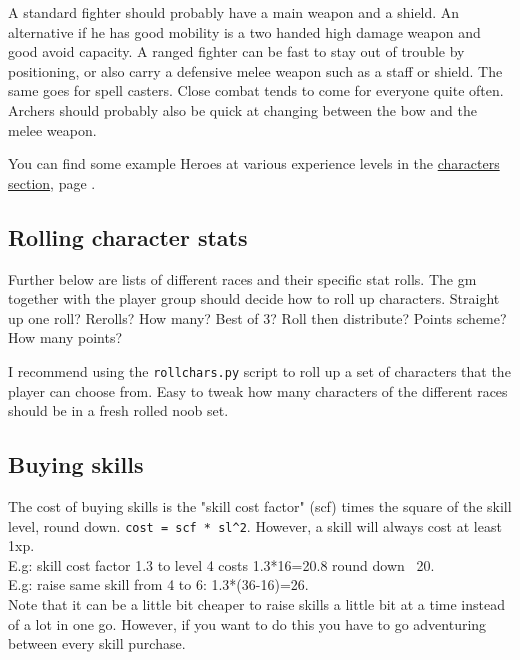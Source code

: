A standard fighter should probably have a main weapon and a shield. An alternative if he has good mobility is a two handed high damage weapon and good avoid capacity. A ranged fighter can be fast to stay out of trouble by positioning, or also carry a defensive melee weapon such as a staff or shield. The same goes for spell casters. Close combat tends to come for everyone quite often. Archers should probably also be quick at changing between the bow and the melee weapon.

You can find some example Heroes at various experience levels in the \hyperref[cpt:characters]{characters section}, page \pageref{cpt:characters}.


\subsection*{Rolling character stats}
Further below are lists of different races and their specific stat rolls. The gm together with the player group should decide how to roll up characters. Straight up one roll? Rerolls? How many? Best of 3? Roll then distribute? Points scheme? How many points?

I recommend using the \verb|rollchars.py| script to roll up a set of characters that the player can choose from. Easy to tweak how many characters of the different races should be in a fresh rolled noob set.





\subsection*{Buying skills}
The cost of buying skills is the "skill cost factor" (scf) times the square of the skill level, round down. \verb|cost = scf * sl^2|. However, a skill will always cost at least 1xp. \\
E.g: skill cost factor 1.3 to level 4 costs 1.3*16=20.8 round down ~20. \\
E.g: raise same skill from 4 to 6: 1.3*(36-16)=26. \\
Note that it can be a little bit cheaper to raise skills a little bit at a time instead of a lot in one go. However, if you want to do this you have to go adventuring between every skill purchase.

